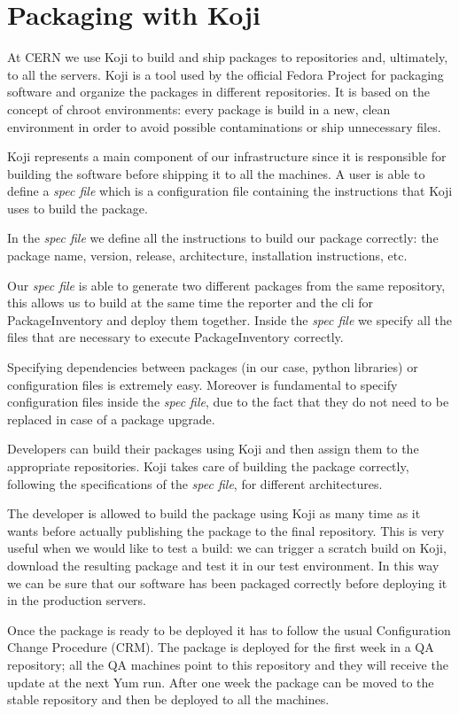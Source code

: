 \section{Packaging with Koji}

At CERN we use Koji to build and ship packages to repositories and,
ultimately, to all the servers. Koji is a tool used by the official Fedora
Project \cite{FedoraProject} for packaging software and organize the
packages in different repositories. It is based on the concept of chroot
environments: every package is build in a new, clean environment in order
to avoid possible contaminations or ship unnecessary files.

Koji represents a main component of our infrastructure since it is
responsible for building the software before shipping it to all the
machines. A user is able to define a \textit{spec file} which is
a configuration file containing the instructions that Koji uses to build
the package.

In the \textit{spec file} we define all the instructions to build our
package correctly: the package name, version, release, architecture,
installation instructions, etc.

Our \textit{spec file} is able to generate two different packages from the
same repository, this allows us to build at the same time the reporter and
the cli for PackageInventory and deploy them together. Inside the
\textit{spec file} we specify all the files that are necessary to execute
PackageInventory correctly.

Specifying dependencies between packages (in our case, python libraries)
or configuration files is extremely easy. Moreover is fundamental to
specify configuration files inside the \textit{spec file}, due to the fact
that they do not need to be replaced in case of a package upgrade.

Developers can build their packages using Koji and then assign them to the
appropriate repositories. Koji takes care of building the package
correctly, following the specifications of the \textit{spec file}, for
different architectures.

The developer is allowed to build the package using Koji as many time as
it wants before actually publishing the package to the final repository.
This is very useful when we would like to test a build: we can trigger
a scratch build on Koji, download the resulting package and test it in our
test environment. In this way we can be sure that our software has been
packaged correctly before deploying it in the production servers.

Once the package is ready to be deployed it has to follow the usual
Configuration Change Procedure (CRM). The package is deployed for the
first week in a QA repository; all the QA machines point to this
repository and they will receive the update at the next Yum run. After one
week the package can be moved to the stable repository and then be
deployed to all the machines.

